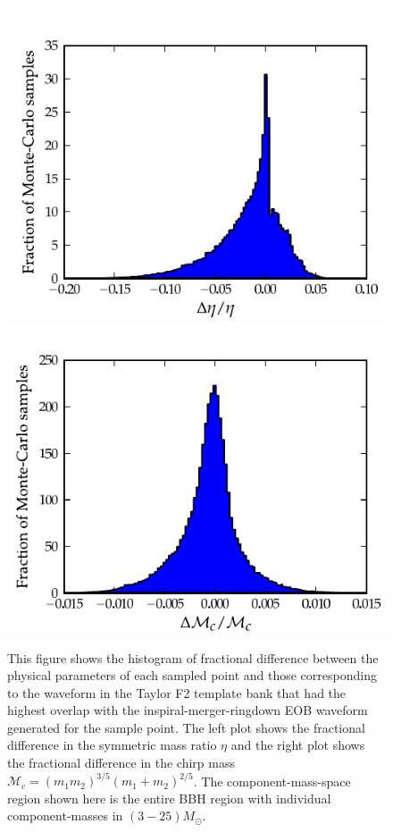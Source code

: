 \documentclass[aps,
prd,
amsmath,
amssymb,
twocolumn,
floatfix,
groupedaddress]{revtex4-1}
\begin{document}
\begin{figure}[]
\centerline{
\includegraphics[scale=0.04, clip=false,keepaspectratio=true, width=\columnwidth]{hist_eta_err14paramF2EOB.pdf}\label{fig:errparams_f2eob_eta}              
\includegraphics[scale=0.04, clip=false, keepaspectratio=true, width=\columnwidth]{hist_mchirp_err14paramF2EOB.pdf}\label{fig:errparams_f2eob_mchirp}
}
\caption{This figure shows the histogram of fractional difference between the physical parameters of each sampled point and those corresponding to the waveform in the Taylor F2 template bank that had the highest overlap with the inspiral-merger-ringdown EOB waveform generated for the sample point. The left plot shows the fractional difference in the symmetric mass ratio $\eta$ and the right plot shows the fractional difference in the chirp mass $\mathcal{M}_c= (m_1m_2)^{3/5}(m_1+m_2)^{2/5}$. The component-mass-space region shown here is the entire BBH region with individual component-masses in $(3-25)M_{\odot}$.}
\label{fig:errparams_f2eob}
\end{figure}
\end{document}
